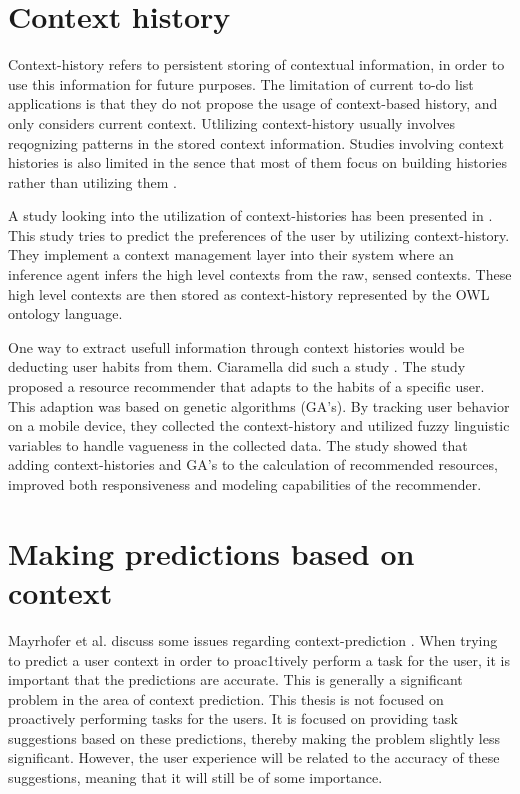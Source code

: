 \section{Context history}

Context-history refers to persistent storing of contextual information, in order to use this information for future purposes. The limitation of current to-do list applications is that they do not propose the usage of context-based history, and only considers current context. Utlilizing context-history usually involves reqognizing patterns in the stored context information. Studies involving context histories is also limited in the sence that most of them focus on building histories rather than utilizing them \cite{chalmers2004historical}.

A study looking into the utilization of context-histories has been presented in \cite{hong2009context}. This study tries to predict the preferences of the user by utilizing context-history. They implement a context management layer into their system where an inference agent infers the high level contexts from the raw, sensed contexts. These high level contexts are then stored as context-history represented by the OWL ontology language.

One way to extract usefull information through context histories would be deducting user habits from them. Ciaramella did such a study \cite{ciaramella2010using}. The study proposed a resource recommender that adapts to the habits of a specific user. This adaption was based on genetic algorithms (GA's). By tracking user behavior on a mobile device, they collected the context-history and utilized fuzzy linguistic variables to handle vagueness in the collected data. The study showed that adding context-histories and GA's to the calculation of recommended resources, improved both responsiveness and modeling capabilities of the recommender.



\section{Making predictions based on context}

Mayrhofer et al. discuss some issues regarding context-prediction \cite{mayrhofer2005context}. When trying to predict a user context in order to proac1tively perform a task for the user, it is important that the predictions are accurate. This is generally a significant problem in the area of context prediction. This thesis is not focused on proactively performing tasks for the users. It is focused on providing task suggestions based on these predictions, thereby making the problem slightly less significant. However, the user experience will be related to the accuracy of these suggestions, meaning that it will still be of some importance.

